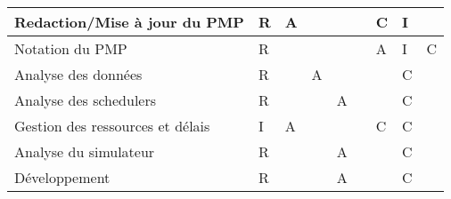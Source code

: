 \documentclass{article}
\begin{document}
\begin{table}[h]
\begin{tabular}{|l|l|l|l|l|l|l|l|l|}
Redaction/Mise à jour du PMP           & R   & A                                                       &                                                         &                                                            &           & C   & I                                                        &                                                           \\ \hline
Notation du PMP                        & R   &                                                         &                                                         &                                                            &           & A   & I                                                        & C                                                         \\ \hline
Analyse des données                    & R   &                                                         & A                                                       &                                                            &           &     & C                                                        &                                                           \\ \hline
Analyse des schedulers                 & R   &                                                         &                                                         & A                                                          &           &     & C                                                        &                                                           \\ \hline
Gestion des ressources et délais       & I   & A                                                       &                                                         &                                                            &           & C   & C                                                        &                                                           \\ \hline
Analyse du simulateur                  & R   &                                                         &                                                         & A                                                          &           &     & C                                                        &                                                           \\ \hline
Développement                          & R   &                                                         &                                                         & A                                                          &           &     & C                                                        &                                                           \\ \hline

\end{tabular}
\end{table}
\end{document}
